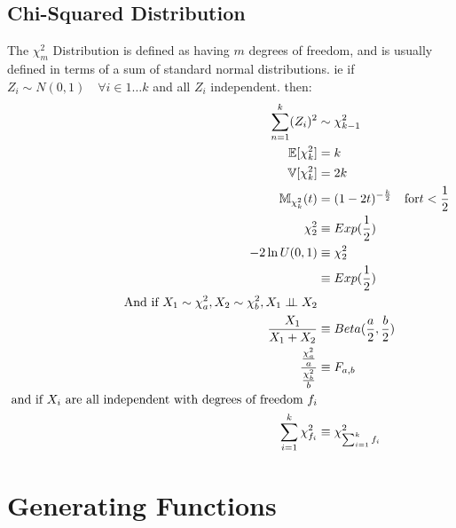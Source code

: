 \subsection{Chi-Squared Distribution}
The $\chi^2_m$ Distribution is defined as having  $m$ degrees of freedom, and
is usually defined in terms of a sum of standard normal distributions. ie if
$Z_i \sim N(0, 1) \quad \forall i \in 1 \dots k$ and all $Z_i$ independent.
then:
\begin{equation*}
    \begin{aligned}
        \sum_{n=1}^{k} (Z_i)^2 &\sim \chi^2_{k-1} \\
        \mathbb{E}[\chi^2_k] &= k\\
        \mathbb{V}[\chi^2_k] &= 2k\\
        \mathbb{M}_{\chi^2_k}(t) &= (1-2t)^{-\frac{k}{2}} \quad \text{for}
        t < \frac{1}{2}\\
        \chi^2_2 &\equiv Exp(\frac{1}{2}) \\
        -2\ln{U(0, 1)} &\equiv \chi^2_2 \\
                       &\equiv Exp(\frac{1}{2})\\
        \text{And if } X_1 \sim \chi^2_a, X_2 \sim \chi^2_b, X_1 \perp \!\!\! \perp X_2 & \\
        \frac{X_1}{X_1 + X_2} &\equiv Beta(\frac{a}{2}, \frac{b}{2}) \\
        \frac{\frac{\chi^2_a}{a}}{\frac{\chi^2_b}{b}} &\equiv F_{a, b} \\
        \text{and if $X_i$ are all independent with degrees of freedom $f_i$}&\\
        \sum_{i=1}^{k} \chi^2_{f_i} &\equiv \chi^2_{\sum_{i=1}^{k} f_i } \\
    \end{aligned}
\end{equation*}

\section{Generating Functions}
